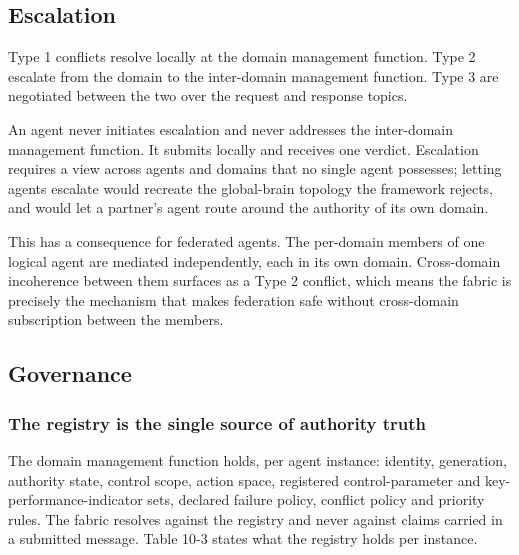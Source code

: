 \hypertarget{escalation}{%
\subsection{Escalation}\label{escalation}}

Type 1 conflicts resolve locally at the domain management function. Type
2 escalate from the domain to the inter-domain management function. Type
3 are negotiated between the two over the request and response topics.

An agent never initiates escalation and never addresses the inter-domain
management function. It submits locally and receives one verdict.
Escalation requires a view across agents and domains that no single
agent possesses; letting agents escalate would recreate the global-brain
topology the framework rejects, and would let a partner's agent route
around the authority of its own domain.

This has a consequence for federated agents. The per-domain members of
one logical agent are mediated independently, each in its own domain.
Cross-domain incoherence between them surfaces as a Type 2 conflict,
which means the fabric is precisely the mechanism that makes federation
safe without cross-domain subscription between the members.

\hypertarget{governance}{%
\subsection{Governance}\label{governance}}

\hypertarget{the-registry-is-the-single-source-of-authority-truth}{%
\subsubsection{The registry is the single source of authority truth}\label{the-registry-is-the-single-source-of-authority-truth}}

The domain management function holds, per agent instance: identity,
generation, authority state, control scope, action space, registered
control-parameter and key-performance-indicator sets, declared failure
policy, conflict policy and priority rules. The fabric resolves against
the registry and never against claims carried in a submitted message.
Table 10-3 states what the registry holds per instance.

